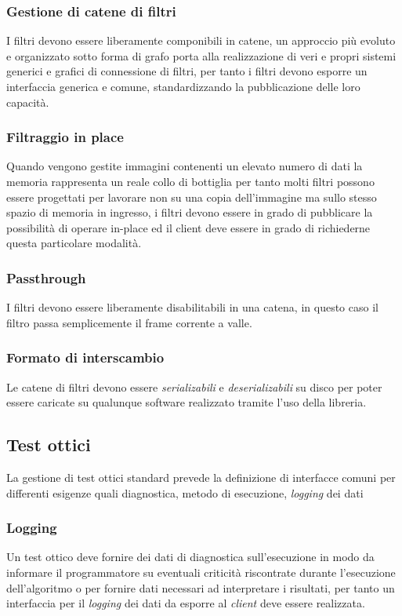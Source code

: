 \subsubsection{Gestione di catene di filtri}
I filtri devono essere liberamente componibili in catene, un approccio più evoluto e organizzato sotto forma di grafo porta alla realizzazione di veri e propri sistemi generici e grafici di connessione di filtri, per tanto i filtri devono esporre un interfaccia generica e comune, standardizzando la pubblicazione delle loro capacità.

\subsubsection{Filtraggio in place}
Quando vengono gestite immagini contenenti un elevato numero di dati la memoria rappresenta un reale collo di bottiglia per tanto molti filtri possono essere progettati per lavorare non su una copia dell'immagine ma sullo stesso spazio di memoria in ingresso, i filtri devono essere in grado di pubblicare la possibilità di operare in-place ed il client deve essere in grado di richiederne questa particolare modalità.

\subsubsection{Passthrough}
I filtri devono essere liberamente disabilitabili in una catena, in questo caso il filtro passa semplicemente il frame corrente a valle.

\subsubsection{Formato di interscambio}
Le catene di filtri devono essere \emph{serializabili} e \emph{deserializabili} su disco per poter essere caricate su qualunque software realizzato tramite l'uso della libreria.

\subsection{Test ottici}
La gestione di test ottici standard prevede la definizione di interfacce comuni per differenti esigenze quali diagnostica, metodo di esecuzione, \emph{logging} dei dati

\subsubsection{Logging}
Un test ottico deve fornire dei dati di diagnostica sull'esecuzione in modo da informare il programmatore su eventuali criticità riscontrate durante l'esecuzione dell'algoritmo o per fornire dati necessari ad interpretare i risultati, per tanto un interfaccia per il \emph{logging} dei dati da esporre al \emph{client} deve essere realizzata.

